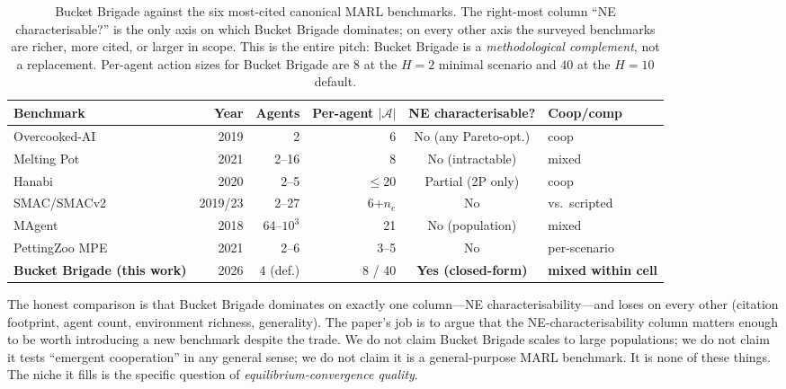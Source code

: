 \documentclass{anvil-paper}
\begin{document}
\begin{table}[t]
  \centering
  \small
  \setlength{\tabcolsep}{4pt}
  \begin{tabular}{lrrrcl}
    \toprule
    Benchmark & Year & Agents & Per-agent $|\mathcal{A}|$ & NE characterisable? & Coop/comp \\
    \midrule
    Overcooked-AI~\citep{overcooked2019}      & 2019      & 2        & 6          & No (any Pareto-opt.) & coop \\
    Melting Pot~\citep{meltingpot2021}        & 2021      & 2--16    & 8          & No (intractable)     & mixed \\
    Hanabi~\citep{hanabi2020}                 & 2020      & 2--5     & $\leq 20$  & Partial (2P only)    & coop \\
    SMAC/SMACv2~\citep{smac2019,smacv2_2023}  & 2019/23   & 2--27    & 6+$n_e$    & No                   & vs.\ scripted \\
    MAgent~\citep{magent2018}                 & 2018      & 64--$10^3$ & 21       & No (population)      & mixed \\
    PettingZoo MPE~\citep{pettingzoo2021}     & 2021      & 2--6     & 3--5       & No                   & per-scenario \\
    \textbf{Bucket Brigade (this work)}       & 2026      & 4 (def.) & 8 / 40     & \textbf{Yes (closed-form)} & \textbf{mixed within cell} \\
    \bottomrule
  \end{tabular}
  \caption{Bucket Brigade against the six most-cited canonical MARL
  benchmarks. The right-most column ``NE characterisable?'' is the only
  axis on which Bucket Brigade dominates; on every other axis the
  surveyed benchmarks are richer, more cited, or larger in scope. This is
  the entire pitch: Bucket Brigade is a \emph{methodological complement},
  not a replacement. Per-agent action sizes for Bucket Brigade are
  $8$ at the $H{=}2$ minimal scenario and $40$ at the $H{=}10$ default.}
  \label{tab:bench}
\end{table}

The honest comparison is that Bucket Brigade dominates on exactly one
column---NE characterisability---and loses on every other (citation
footprint, agent count, environment richness, generality). The paper's job
is to argue that the NE-characterisability column matters enough to be worth
introducing a new benchmark despite the trade. We do not claim Bucket
Brigade scales to large populations; we do not claim it tests
``emergent cooperation'' in any general sense; we do not claim it is a
general-purpose MARL benchmark. It is none of these things. The niche it
fills is the specific question of \emph{equilibrium-convergence quality}.
\end{document}

